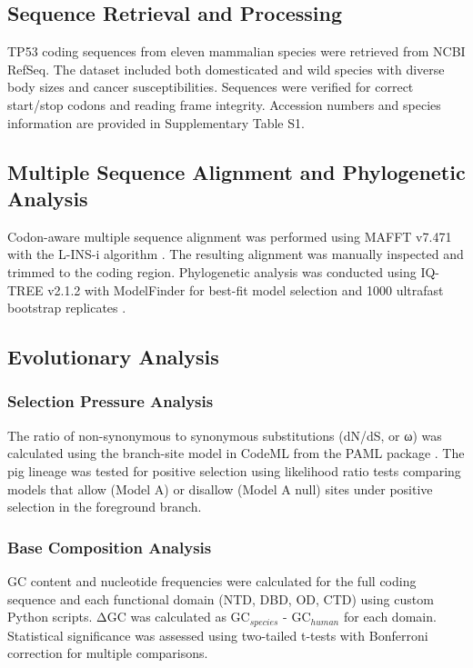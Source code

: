 \subsection{Sequence Retrieval and Processing}
TP53 coding sequences from eleven mammalian species were retrieved from NCBI RefSeq. The dataset included both domesticated and wild species with diverse body sizes and cancer susceptibilities. Sequences were verified for correct start/stop codons and reading frame integrity. Accession numbers and species information are provided in Supplementary Table S1.

\subsection{Multiple Sequence Alignment and Phylogenetic Analysis}
Codon-aware multiple sequence alignment was performed using MAFFT v7.471 with the L-INS-i algorithm \citep{katoh2013mafft}. The resulting alignment was manually inspected and trimmed to the coding region. Phylogenetic analysis was conducted using IQ-TREE v2.1.2 with ModelFinder for best-fit model selection and 1000 ultrafast bootstrap replicates \citep{nguyen2015iqtree}.

\subsection{Evolutionary Analysis}
\subsubsection{Selection Pressure Analysis}
The ratio of non-synonymous to synonymous substitutions (dN/dS, or ω) was calculated using the branch-site model in CodeML from the PAML package \citep{yang2007paml}. The pig lineage was tested for positive selection using likelihood ratio tests comparing models that allow (Model A) or disallow (Model A null) sites under positive selection in the foreground branch.

\subsubsection{Base Composition Analysis}
GC content and nucleotide frequencies were calculated for the full coding sequence and each functional domain (NTD, DBD, OD, CTD) using custom Python scripts. ΔGC was calculated as GC$_{species}$ - GC$_{human}$ for each domain. Statistical significance was assessed using two-tailed t-tests with Bonferroni correction for multiple comparisons.

